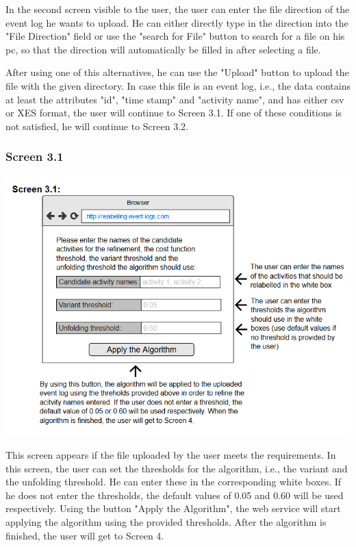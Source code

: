 \documentclass[notitlepage]{article}
\begin{document}
\begin{flushleft}
In the second screen visible to the user, the user can enter the file direction of the event log he wants to upload. He can either directly type in the direction into the "File Direction" field or use the "search for File" button to search for a file on his pc, so that the direction will automatically be filled in after selecting a file.

After using one of this alternatives, he can use the "Upload" button to upload the file with the given directory. In case this file is an event log, i.e., the data contains at least the attributes "id", "time stamp" and "activity name", and has either csv or XES format, the user will continue to Screen 3.1. If one of these conditions is not satisfied, he will continue to Screen 3.2. 


\subsubsection{Screen 3.1}
\includegraphics[scale=0.9]{InterfaceMockup3-1.png}

This screen appears if the file uploaded by the user meets the requirements. In this screen, the user can set the thresholds for the algorithm, i.e., the variant and the unfolding threshold. He can enter these in the corresponding white boxes. If he does not enter the thresholds, the default values of 0.05 and 0.60 will be used respectively. Using the button "Apply the Algorithm", the web service will start applying the algorithm using the provided thresholds. After the algorithm is finished, the user will get to Screen 4.


\end{flushleft}
\end{document}
